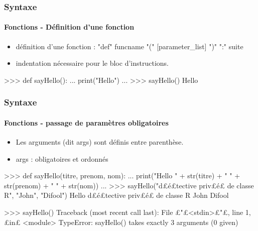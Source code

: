 \begin{frame}[fragile]
\frametitle{Syntaxe}
\framesubtitle{Fonctions - Définition d'une fonction}
\begin{itemize}
\item définition d'une fonction : "def" funcname "(" [parameter\_list] ")" ":" suite
\item indentation nécessaire pour le bloc d'instructions. 
\end{itemize}
\begin{pythonConsole}
>>> def sayHello(): 
...    print("Hello")
...
>>> sayHello()
Hello
\end{pythonConsole}
\end{frame}
\begin{frame}[fragile]
\frametitle{Syntaxe}
\framesubtitle{Fonctions - passage de paramètres obligatoires}
\begin{itemize}
\item Les arguments (dit args) sont définis entre parenthèse. 
\item args : obligatoires et ordonnés
\end{itemize}
\begin{pythonConsole}
>>> def sayHello(titre, prenom, nom): 
...    print("Hello " + str(titre) + " " + str(prenom) + " " + str(nom))
...
>>> sayHello("d£{\color{magenta}é}£tective priv£{\color{magenta}é}£ de classe R", "John", "Difool")
Hello d£é£tective priv£é£ de classe R John Difool
\end{pythonConsole}
\begin{pythonConsole}
>>> sayHello()
Traceback (most recent call last):
  File £"£<stdin>£"£, line 1, £in£ <module>
TypeError: sayHello() takes exactly 3 arguments (0 given)
\end{pythonConsole}
\end{frame}
